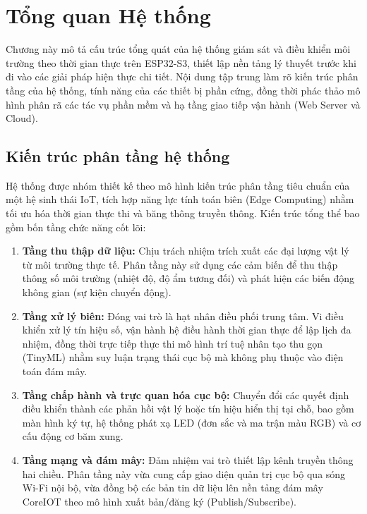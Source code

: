 \newpage
\section{Tổng quan Hệ thống}

Chương này mô tả cấu trúc tổng quát của hệ thống giám sát và điều khiển môi trường theo thời gian thực trên ESP32-S3, thiết lập nền tảng lý thuyết trước khi đi vào các giải pháp hiện thực chi tiết. Nội dung tập trung làm rõ kiến trúc phân tầng của hệ thống, tính năng của các thiết bị phần cứng, đồng thời phác thảo mô hình phân rã các tác vụ phần mềm và hạ tầng giao tiếp vận hành (Web Server và Cloud).

\subsection{Kiến trúc phân tầng hệ thống}

Hệ thống được nhóm thiết kế theo mô hình kiến trúc phân tầng tiêu chuẩn của một hệ sinh thái IoT, tích hợp năng lực tính toán biên (Edge Computing) nhằm tối ưu hóa thời gian thực thi và băng thông truyền thông. Kiến trúc tổng thể bao gồm bốn tầng chức năng cốt lõi:

\begin{enumerate}
    \item \textbf{Tầng thu thập dữ liệu:} Chịu trách nhiệm trích xuất các đại lượng vật lý từ môi trường thực tế. Phân tầng này sử dụng các cảm biến để thu thập thông số môi trường (nhiệt độ, độ ẩm tương đối) và phát hiện các biến động không gian (sự kiện chuyển động).
    \item \textbf{Tầng xử lý biên:} Đóng vai trò là hạt nhân điều phối trung tâm. Vi điều khiển xử lý tín hiệu số, vận hành hệ điều hành thời gian thực để lập lịch đa nhiệm, đồng thời trực tiếp thực thi mô hình trí tuệ nhân tạo thu gọn (TinyML) nhằm suy luận trạng thái cục bộ mà không phụ thuộc vào điện toán đám mây.
    \item \textbf{Tầng chấp hành và trực quan hóa cục bộ:} Chuyển đổi các quyết định điều khiển thành các phản hồi vật lý hoặc tín hiệu hiển thị tại chỗ, bao gồm màn hình ký tự, hệ thống phát xạ LED (đơn sắc và ma trận màu RGB) và cơ cấu động cơ băm xung.
    \item \textbf{Tầng mạng và đám mây:} Đảm nhiệm vai trò thiết lập kênh truyền thông hai chiều. Phân tầng này vừa cung cấp giao diện quản trị cục bộ qua sóng Wi-Fi nội bộ, vừa đồng bộ các bản tin dữ liệu lên nền tảng đám mây CoreIOT theo mô hình xuất bản/đăng ký (Publish/Subscribe).
\end{enumerate}

